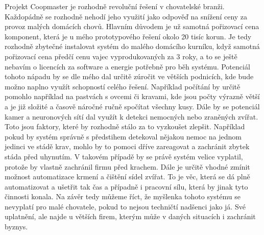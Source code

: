 Projekt Coopmaster je rozhodně revoluční řešení v chovatelské branži.
Každopádně se rozhodně nehodí jeho využití jako odpověď na snížení ceny za provoz malých domácích chovů.
Hlavním důvodem je už samotná pořizovací cena komponent, která je u mého prototypového řešení okolo 20 tisíc korun.
Je tedy rozhodně zbytečné instalovat systém do malého domácího kurníku, když samotná pořizovací cena předčí cenu vajec vyprodukovaných za 3 roky, a to se ještě nebavím o licencích za software a energie potřebně pro běh systému.\newline
Potenciál tohoto nápadu by se dle mého dal určitě zúročit ve větších podnicích, kde bude možno naplno využít schopností celého řešení.
Například počítání by určitě pomohlo například na pastvách s ovcemi či kravami, kde jsou počty výrazně větší a je již složité a časově náročné ručně spočítat všechny kusy.
Dále by se potenciál kamer a neuronových sítí dal využít k detekci nemocných nebo zraněných zvířat.
Toto jsou faktory, které by rozhodně stálo za to vyzkoušet zlepšit.
Například pokud by systém správně s předstihem detekoval nějakou nemoc na jednom jedinci ve stádě krav, mohlo by to pomoci dříve zareagovat a zachránit zbytek stáda před uhynutím.
V takovém případě by se právě systém velice vyplatil, protože by vlastně zachránil firmu před krachem.\newline
Dále je určitě vhodné zmínit možnost automatizace krmení a čištění sídel zvířat.
To je věc, která se dá plně automatizovat a ušetřit tak čas a případně i pracovní sílu, která by jinak tyto činnosti konala.\newline
Na závěr tedy můžeme říct, že myšlenka tohoto systému se nevyplatí pro malé chovatele, pokud to nejsou techničtí nadšenci jako já.
Své uplatnění, ale najde u větších firem, kterým může v daných situacích i zachránit byznys.



